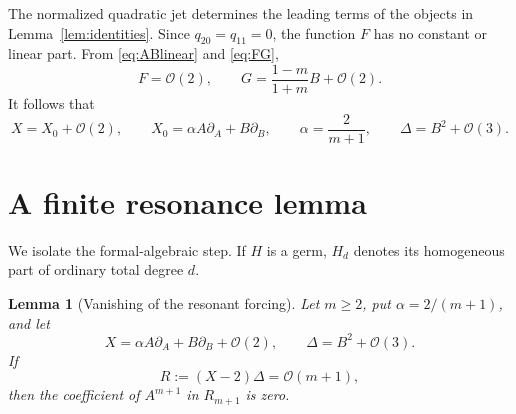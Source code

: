 \documentclass[11pt]{article}
\newtheorem{lemma}[theorem]{Lemma}
\theoremstyle{remark}
\newcommand{\cO}{\mathcal O}
\begin{document}
The normalized quadratic jet determines the leading terms of the objects in
Lemma~\ref{lem:identities}.  Since \(q_{20}=q_{11}=0\), the function \(F\)
has no constant or linear part.  From \eqref{eq:ABlinear} and
\eqref{eq:FG},
\begin{equation}
 F=\cO(2),\qquad
 G=\frac{1-m}{1+m}B+\cO(2).                           \label{eq:leadingFG}
\end{equation}
It follows that
\begin{equation}
 X=X_0+\cO(2),\qquad
 X_0=\alpha A\partial_A+B\partial_B,\qquad
 \alpha=\frac{2}{m+1},\qquad
 \Delta=B^2+\cO(3).                                  \label{eq:leading}
\end{equation}

\section{A finite resonance lemma}                                  \label{sec:normal}

We isolate the formal-algebraic step.  If \(H\) is a germ, \(H_d\) denotes
its homogeneous part of ordinary total degree \(d\).

\begin{lemma}[Vanishing of the resonant forcing]                    \label{lem:resonance}
Let \(m\ge2\), put \(\alpha=2/(m+1)\), and let
\[
 X=\alpha A\partial_A+B\partial_B+\cO(2),\qquad
 \Delta=B^2+\cO(3).
\]
If
\begin{equation}
                             R:=(X-2)\Delta=\cO(m+1),                \label{eq:Rorder}
\end{equation}
then the coefficient of \(A^{m+1}\) in \(R_{m+1}\) is zero.
\end{lemma}
\end{document}
